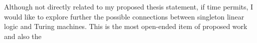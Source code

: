 Although not directly related to my proposed thesis statement, if time permits, I would like to explore further the possible connections between singleton linear logic and Turing machines.
This is the most open-ended item of proposed work and also the 




